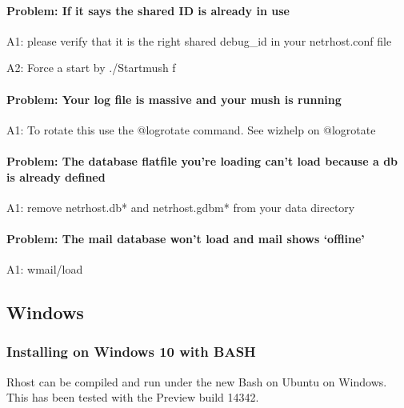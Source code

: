 \documentclass[letterpaper,10pt,english]{sphinxmanual}
\begin{document}
\paragraph{Problem: If it says the shared ID is already in use}
\label{\detokenize{installation:problem-if-it-says-the-shared-id-is-already-in-use}}
\sphinxAtStartPar
A1: please verify that it is the right shared debug\_id in your netrhost.conf file

\sphinxAtStartPar
A2: Force a start by ./Startmush \sphinxhyphen{}f


\paragraph{Problem: Your log file is massive and your mush is running}
\label{\detokenize{installation:problem-your-log-file-is-massive-and-your-mush-is-running}}
\sphinxAtStartPar
A1: To rotate this use the @logrotate command. See wizhelp on @logrotate


\paragraph{Problem: The database flatfile you’re loading can’t load because a db is already defined}
\label{\detokenize{installation:problem-the-database-flatfile-you-re-loading-can-t-load-because-a-db-is-already-defined}}
\sphinxAtStartPar
A1: remove netrhost.db* and netrhost.gdbm* from your data directory


\paragraph{Problem: The mail database won’t load and mail shows ‘offline’}
\label{\detokenize{installation:problem-the-mail-database-won-t-load-and-mail-shows-offline}}
\sphinxAtStartPar
A1: wmail/load


\subsection{Windows}
\label{\detokenize{installation:windows}}

\subsubsection{Installing on Windows 10 with BASH}
\label{\detokenize{installation:installing-on-windows-10-with-bash}}
\sphinxAtStartPar
Rhost can be compiled and run under the new Bash on Ubuntu on Windows.
This has been tested with the Preview build 14342.
\end{document}
